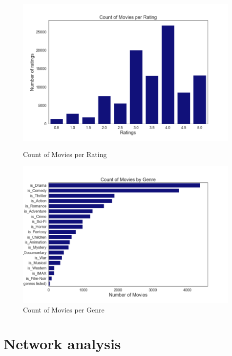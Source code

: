 \documentclass[12pt]{article}
\numberwithin{equation}{section}
\begin{document}
\begin{figure}[h!]
    \begin{minipage}[b]{0.49\linewidth}
         \centering
  	\includegraphics[width=0.99\textwidth]{count_rating.png}
  	\caption{Count of Movies per Rating}
  	\label{fig:count_ranking}
    \end{minipage}
    \hspace{0.01cm}
    \begin{minipage}[b]{0.49\linewidth}
        \centering
  	\includegraphics[width=0.99\textwidth]{count_genre.png}
  	\caption{Count of Movies per Genre}
  	\label{fig:count_genre}
    \end{minipage}
\end{figure}

\section{Network analysis}
\end{document}
